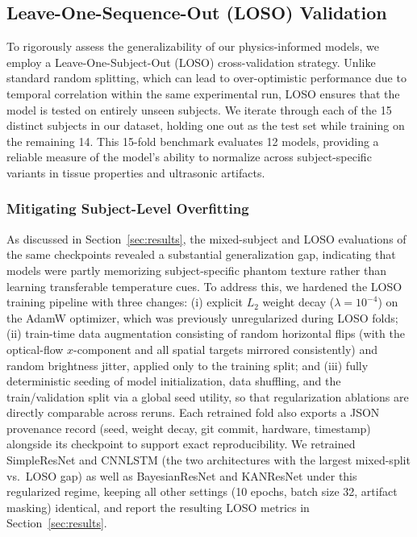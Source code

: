 \documentclass[conference]{IEEEtran}
\begin{document}
\subsection{Leave-One-Sequence-Out (LOSO) Validation}
To rigorously assess the generalizability of our physics-informed models, we employ a Leave-One-Subject-Out (LOSO) cross-validation strategy. Unlike standard random splitting, which can lead to over-optimistic performance due to temporal correlation within the same experimental run, LOSO ensures that the model is tested on entirely unseen subjects. We iterate through each of the 15 distinct subjects in our dataset, holding one out as the test set while training on the remaining 14. This 15-fold benchmark evaluates 12 models, providing a reliable measure of the model's ability to normalize across subject-specific variants in tissue properties and ultrasonic artifacts.

\subsubsection{Mitigating Subject-Level Overfitting}
As discussed in Section~\ref{sec:results}, the mixed-subject and LOSO evaluations of the same checkpoints revealed a substantial generalization gap, indicating that models were partly memorizing subject-specific phantom texture rather than learning transferable temperature cues. To address this, we hardened the LOSO training pipeline with three changes: (i) explicit $L_2$ weight decay ($\lambda=10^{-4}$) on the AdamW optimizer, which was previously unregularized during LOSO folds; (ii) train-time data augmentation consisting of random horizontal flips (with the optical-flow $x$-component and all spatial targets mirrored consistently) and random brightness jitter, applied only to the training split; and (iii) fully deterministic seeding of model initialization, data shuffling, and the train/validation split via a global seed utility, so that regularization ablations are directly comparable across reruns. Each retrained fold also exports a JSON provenance record (seed, weight decay, git commit, hardware, timestamp) alongside its checkpoint to support exact reproducibility. We retrained SimpleResNet and CNNLSTM (the two architectures with the largest mixed-split vs.\ LOSO gap) as well as BayesianResNet and KANResNet under this regularized regime, keeping all other settings (10 epochs, batch size 32, artifact masking) identical, and report the resulting LOSO metrics in Section~\ref{sec:results}.
\end{document}
